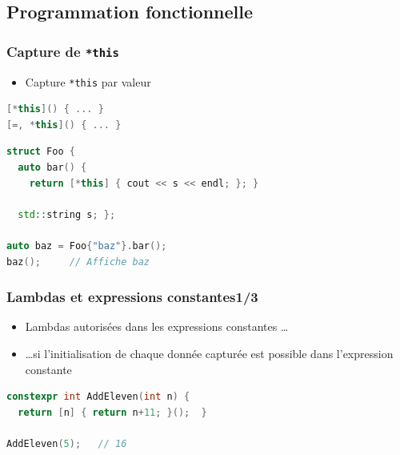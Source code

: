 \documentclass[C++.tex]{subfiles}
\begin{document}
\subsection*{Programmation fonctionnelle}
\begin{frame}[fragile]
	\frametitle{Capture de \lstinline|*this|}
	\begin{itemize}
		\item Capture \lstinline|*this| par valeur

	\end{itemize}

	\begin{lstlisting}[language=C++]
[*this]() { ... }
[=, *this]() { ... }\end{lstlisting}

	\begin{lstlisting}[language=C++]
struct Foo {
  auto bar() {
    return [*this] { cout << s << endl; }; }

  std::string s; };

auto baz = Foo{"baz"}.bar();
baz();     // Affiche baz\end{lstlisting}

\end{frame}

\begin{frame}[fragile]
	\frametitle{Lambdas et expressions constantes\titlehfill{}1/3}
	\begin{itemize}
		\item Lambdas autorisées dans les expressions constantes \ldots
		\item \ldots{}si l'initialisation de chaque donnée capturée est possible dans l'expression constante
	\end{itemize}

	\begin{lstlisting}[language=C++]
constexpr int AddEleven(int n) {
  return [n] { return n+11; }();  }

AddEleven(5);   // 16\end{lstlisting}
\end{frame}
\end{document}

